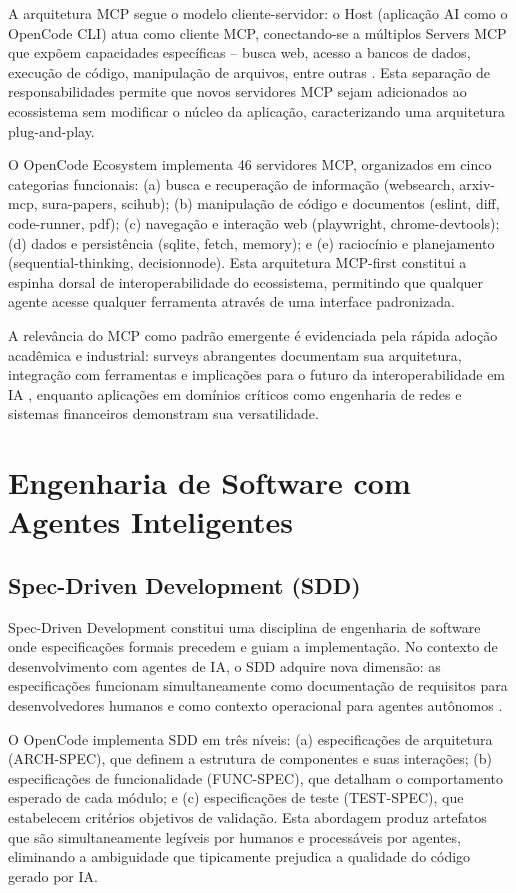 \documentclass[12pt,a4paper,sumario=tradicional]{abntex2}
\begin{document}
A arquitetura MCP segue o modelo cliente-servidor: o Host (aplicação AI como o OpenCode CLI) atua como cliente MCP, conectando-se a múltiplos Servers MCP que expõem capacidades específicas -- busca web, acesso a bancos de dados, execução de código, manipulação de arquivos, entre outras \cite{sekarmcp2026}. Esta separação de responsabilidades permite que novos servidores MCP sejam adicionados ao ecossistema sem modificar o núcleo da aplicação, caracterizando uma arquitetura plug-and-play.

O OpenCode Ecosystem implementa 46 servidores MCP, organizados em cinco categorias funcionais: (a) busca e recuperação de informação (websearch, arxiv-mcp, sura-papers, scihub); (b) manipulação de código e documentos (eslint, diff, code-runner, pdf); (c) navegação e interação web (playwright, chrome-devtools); (d) dados e persistência (sqlite, fetch, memory); e (e) raciocínio e planejamento (sequential-thinking, decisionnode). Esta arquitetura MCP-first constitui a espinha dorsal de interoperabilidade do ecossistema, permitindo que qualquer agente acesse qualquer ferramenta através de uma interface padronizada.

A relevância do MCP como padrão emergente é evidenciada pela rápida adoção acadêmica e industrial: surveys abrangentes documentam sua arquitetura, integração com ferramentas e implicações para o futuro da interoperabilidade em IA \cite{lei2026survey}, enquanto aplicações em domínios críticos como engenharia de redes \cite{okula2026era} e sistemas financeiros \cite{shaik2025cbi} demonstram sua versatilidade.

\section{Engenharia de Software com Agentes Inteligentes}

\subsection{Spec-Driven Development (SDD)}

Spec-Driven Development constitui uma disciplina de engenharia de software onde especificações formais precedem e guiam a implementação. No contexto de desenvolvimento com agentes de IA, o SDD adquire nova dimensão: as especificações funcionam simultaneamente como documentação de requisitos para desenvolvedores humanos e como contexto operacional para agentes autônomos \cite{garfinkel2026acm}.

O OpenCode implementa SDD em três níveis: (a) especificações de arquitetura (ARCH-SPEC), que definem a estrutura de componentes e suas interações; (b) especificações de funcionalidade (FUNC-SPEC), que detalham o comportamento esperado de cada módulo; e (c) especificações de teste (TEST-SPEC), que estabelecem critérios objetivos de validação. Esta abordagem produz artefatos que são simultaneamente legíveis por humanos e processáveis por agentes, eliminando a ambiguidade que tipicamente prejudica a qualidade do código gerado por IA.
\end{document}
